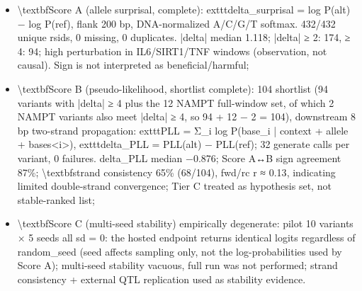 \documentclass[11pt]{article}
\begin{document}
\begin{itemize}\setlength{\itemsep}{1pt}
\item \textbackslash{}textbf{Score A (allele surprisal, complete)}: 	exttt{delta\_surprisal = log P(alt) − log P(ref)}, flank 200 bp, DNA-normalized A/C/G/T softmax. 432/432 unique rsids, 0 missing, 0 duplicates. |delta| median 1.118; |delta| ≥ 2: 174, ≥ 4: 94; high perturbation in IL6/SIRT1/TNF windows (observation, not causal). Sign is not interpreted as beneficial/harmful;
\item \textbackslash{}textbf{Score B (pseudo-likelihood, shortlist complete)}: 104 shortlist (94 variants with |delta| ≥ 4 plus the 12 NAMPT full-window set, of which 2 NAMPT variants also meet |delta| ≥ 4, so 94 + 12 − 2 = 104), downstream 8 bp two-strand propagation: 	exttt{PLL = Σ\_i log P(base\_i | context + allele + bases<i>)}, 	exttt{delta\_PLL = PLL(alt) − PLL(ref)}; 32 generate calls per variant, 0 failures. delta\_PLL median −0.876; Score A↔B sign agreement 87\%; \textbackslash{}textbf{strand consistency 65\% (68/104), fwd/rc r ≈ 0.13}, indicating limited double-strand convergence; Tier C treated as hypothesis set, not stable-ranked list;
\item \textbackslash{}textbf{Score C (multi-seed stability) empirically degenerate}: pilot 10 variants × 5 seeds all sd = 0: the hosted endpoint returns identical logits regardless of random\_seed (seed affects sampling only, not the log-probabilities used by Score A); multi-seed stability vacuous, full run was not performed; strand consistency + external QTL replication used as stability evidence.
\end{itemize}
\end{document}
